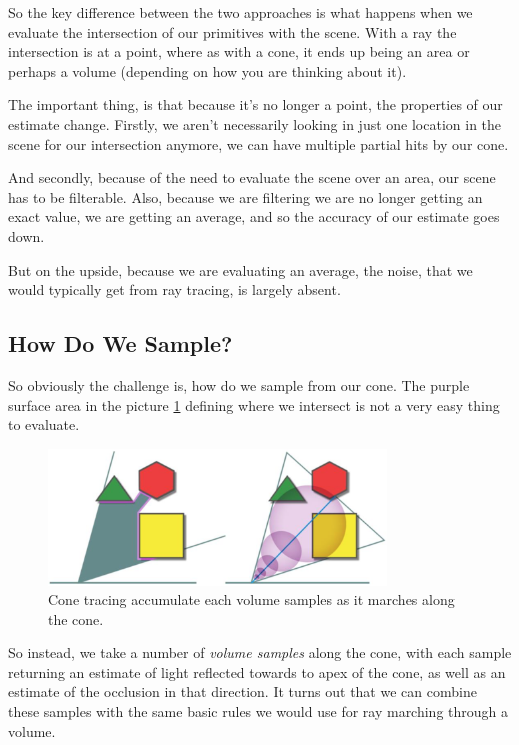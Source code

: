 So the key difference between the two approaches is what happens when we evaluate the intersection of our primitives with the scene. With a ray the intersection is at a point, where as with a cone, it ends up being an area or perhaps a volume (depending on how you are thinking about it).

The important thing, is that because it's no longer a point, the properties of our estimate change. Firstly, we aren't necessarily looking in just one location in the scene for our intersection anymore, we can have multiple partial hits by our cone.

And secondly, because of the need to evaluate the scene over an area, our scene has to be filterable. Also, because we are filtering we are no longer getting an exact value, we are getting an average, and so the accuracy of our estimate goes down.

But on the upside, because we are evaluating an average, the noise, that we would typically get from ray tracing, is largely absent.



\subsection{How Do We Sample?}
So obviously the challenge is, how do we sample from our cone. The purple surface area in the picture \ref{f:cone-sample} defining where we intersect is not a very easy thing to evaluate. 

\begin{figure}\label{f:cone-sample}
	\begin{center}
		\includegraphics[width=0.8\textwidth]{graphics/vct/vct-2-2}
	\end{center}
	\caption{Cone tracing accumulate each volume samples as it marches along the cone.}
\end{figure}

So instead, we take a number of \textit{volume samples} along the cone, with each sample returning an estimate of light reflected towards to apex of the cone, as well as an estimate of the occlusion in that direction. It turns out that we can combine these samples with the same basic rules we would use for ray marching through a volume.





